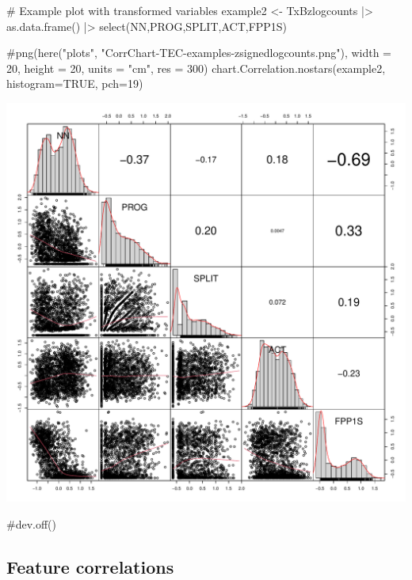 \documentclass[
  letterpaper,
  DIV=11,
  numbers=noendperiod]{scrreprt}
\newenvironment{Shaded}{\begin{snugshade}}{\end{snugshade}}
\newcommand{\AttributeTok}[1]{\textcolor[rgb]{0.40,0.45,0.13}{#1}}
\newcommand{\CommentTok}[1]{\textcolor[rgb]{0.37,0.37,0.37}{#1}}
\newcommand{\ConstantTok}[1]{\textcolor[rgb]{0.56,0.35,0.01}{#1}}
\newcommand{\DecValTok}[1]{\textcolor[rgb]{0.68,0.00,0.00}{#1}}
\newcommand{\FunctionTok}[1]{\textcolor[rgb]{0.28,0.35,0.67}{#1}}
\newcommand{\NormalTok}[1]{\textcolor[rgb]{0.00,0.23,0.31}{#1}}
\newcommand{\OtherTok}[1]{\textcolor[rgb]{0.00,0.23,0.31}{#1}}
\newcommand{\SpecialCharTok}[1]{\textcolor[rgb]{0.37,0.37,0.37}{#1}}
\begin{document}
\begin{Shaded}
\begin{Highlighting}[]
\CommentTok{\# Example plot with transformed variables}
\NormalTok{example2 }\OtherTok{\textless{}{-}}\NormalTok{ TxBzlogcounts }\SpecialCharTok{|\textgreater{}} 
  \FunctionTok{as.data.frame}\NormalTok{() }\SpecialCharTok{|\textgreater{}}  
  \FunctionTok{select}\NormalTok{(NN,PROG,SPLIT,ACT,FPP1S)}

\CommentTok{\#png(here("plots", "CorrChart{-}TEC{-}examples{-}zsignedlogcounts.png"), width = 20, height = 20, units = "cm", res = 300)}
\FunctionTok{chart.Correlation.nostars}\NormalTok{(example2, }\AttributeTok{histogram=}\ConstantTok{TRUE}\NormalTok{, }\AttributeTok{pch=}\DecValTok{19}\NormalTok{)}
\end{Highlighting}
\end{Shaded}

\includegraphics{Ch6_data_prep_files/figure-pdf/example-correlation-plots2-1.pdf}

\begin{Shaded}
\begin{Highlighting}[]
\CommentTok{\#dev.off()}
\end{Highlighting}
\end{Shaded}

\subsection{Feature correlations}\label{feature-correlations}
\end{document}
